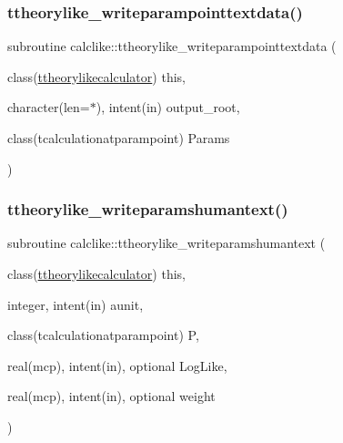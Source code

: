 \mbox{\label{namespacecalclike_acb1cb4737fc9ec3a805214e87b444b00}} 
\subsubsection{\texorpdfstring{ttheorylike\+\_\+writeparampointtextdata()}{ttheorylike\_writeparampointtextdata()}}
{\footnotesize\ttfamily subroutine calclike\+::ttheorylike\+\_\+writeparampointtextdata (\begin{DoxyParamCaption}\item[{class(\mbox{\hyperlink{structcalclike_1_1ttheorylikecalculator}{ttheorylikecalculator}})}]{this,  }\item[{character(len=$\ast$), intent(in)}]{output\+\_\+root,  }\item[{class(tcalculationatparampoint)}]{Params }\end{DoxyParamCaption})\hspace{0.3cm}{\ttfamily [private]}}

\mbox{\label{namespacecalclike_a5c185d1a702fe31d3d1204d919b338da}} 
\subsubsection{\texorpdfstring{ttheorylike\+\_\+writeparamshumantext()}{ttheorylike\_writeparamshumantext()}}
{\footnotesize\ttfamily subroutine calclike\+::ttheorylike\+\_\+writeparamshumantext (\begin{DoxyParamCaption}\item[{class(\mbox{\hyperlink{structcalclike_1_1ttheorylikecalculator}{ttheorylikecalculator}})}]{this,  }\item[{integer, intent(in)}]{aunit,  }\item[{class(tcalculationatparampoint)}]{P,  }\item[{real(mcp), intent(in), optional}]{Log\+Like,  }\item[{real(mcp), intent(in), optional}]{weight }\end{DoxyParamCaption})\hspace{0.3cm}{\ttfamily [private]}}

